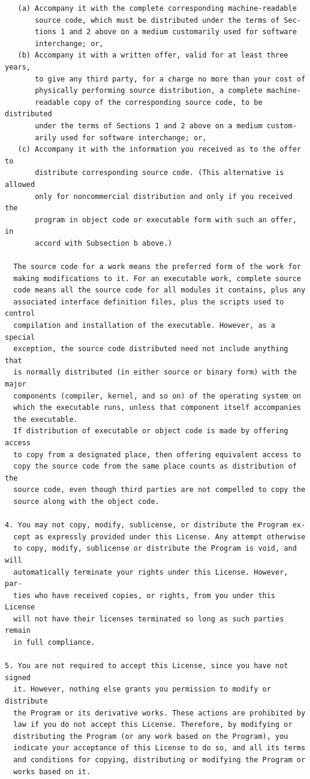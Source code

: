 \documentclass[11pt]{report}
\begin{document}
\begin{appendix}
\begin{verbatim}
   (a) Accompany it with the complete corresponding machine-readable
       source code, which must be distributed under the terms of Sec-
       tions 1 and 2 above on a medium customarily used for software
       interchange; or,
   (b) Accompany it with a written offer, valid for at least three years,
       to give any third party, for a charge no more than your cost of
       physically performing source distribution, a complete machine-
       readable copy of the corresponding source code, to be distributed
       under the terms of Sections 1 and 2 above on a medium custom-
       arily used for software interchange; or,
   (c) Accompany it with the information you received as to the offer to
       distribute corresponding source code. (This alternative is allowed
       only for noncommercial distribution and only if you received the
       program in object code or executable form with such an offer, in
       accord with Subsection b above.)

  The source code for a work means the preferred form of the work for
  making modifications to it. For an executable work, complete source
  code means all the source code for all modules it contains, plus any
  associated interface definition files, plus the scripts used to control
  compilation and installation of the executable. However, as a special
  exception, the source code distributed need not include anything that
  is normally distributed (in either source or binary form) with the major
  components (compiler, kernel, and so on) of the operating system on
  which the executable runs, unless that component itself accompanies
  the executable.
  If distribution of executable or object code is made by offering access
  to copy from a designated place, then offering equivalent access to
  copy the source code from the same place counts as distribution of the
  source code, even though third parties are not compelled to copy the
  source along with the object code.

4. You may not copy, modify, sublicense, or distribute the Program ex-
  cept as expressly provided under this License. Any attempt otherwise
  to copy, modify, sublicense or distribute the Program is void, and will
  automatically terminate your rights under this License. However, par-
  ties who have received copies, or rights, from you under this License
  will not have their licenses terminated so long as such parties remain
  in full compliance.

5. You are not required to accept this License, since you have not signed
  it. However, nothing else grants you permission to modify or distribute
  the Program or its derivative works. These actions are prohibited by
  law if you do not accept this License. Therefore, by modifying or
  distributing the Program (or any work based on the Program), you
  indicate your acceptance of this License to do so, and all its terms
  and conditions for copying, distributing or modifying the Program or
  works based on it.


\end{verbatim}
\end{appendix}
\end{document}
